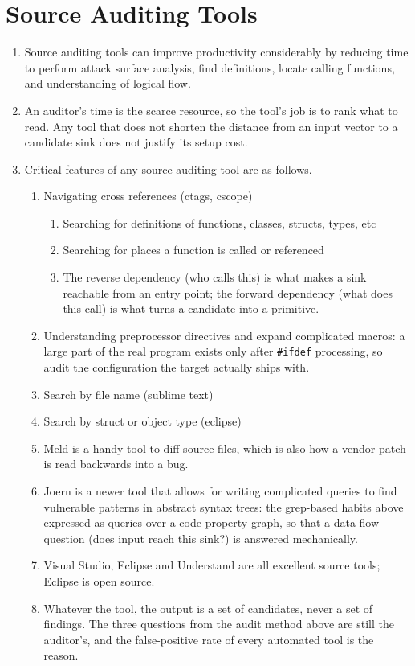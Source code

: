 \documentclass[12pt]{Training}
\begin{document}
\section*{Source Auditing Tools}
\begin{enumerate}
	\item Source auditing tools can improve productivity considerably by reducing time to perform attack surface analysis, find definitions, locate calling functions, and understanding of logical flow.
	\item An auditor's time is the scarce resource, so the tool's job is to rank what to read. Any tool that does not shorten the distance from an input vector to a candidate sink does not justify its setup cost.
	\item Critical features of any source auditing tool are as follows.
		\begin{enumerate}	
			\item Navigating cross references (ctags, cscope)
				\begin{enumerate}
					\item Searching for definitions of functions, classes, structs, types, etc
					\item Searching for places a function is called or referenced
					\item The reverse dependency (who calls this) is what makes a sink reachable from an entry point; the forward dependency (what does this call) is what turns a candidate into a primitive.
				\end{enumerate}
			\item Understanding preprocessor directives and expand complicated macros: a large part of the real program exists only after \lstinline{#ifdef} processing, so audit the configuration the target actually ships with.
			\item Search by file name (sublime text)
			\item Search by struct or object type (eclipse)
			\item Meld is a handy tool to diff source files, which is also how a vendor patch is read backwards into a bug.
			\item Joern is a newer tool that allows for writing complicated queries to find vulnerable patterns in abstract syntax trees: the grep-based habits above expressed as queries over a code property graph, so that a data-flow question (does input reach this sink?) is answered mechanically.
			\item Visual Studio, Eclipse and Understand are all excellent source tools; Eclipse is open source.
			\item Whatever the tool, the output is a set of candidates, never a set of findings. The three questions from the audit method above are still the auditor's, and the false-positive rate of every automated tool is the reason.
		\end{enumerate}	
\end{enumerate}
\end{document}
